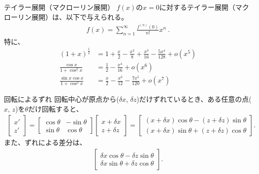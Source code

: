 


\begin{Formula}[label=formula:taylorexpansion]{テイラー展開（マクローリン展開）}
$f(x)$の$x = 0$に対するテイラー展開（マクローリン展開）は、以下で与えられる。
\begin{align*}
  f(x) = \sum_{n=1}^{\infty}\frac{f^{(n)}(0)}{n!}x^n\ .
\end{align*}
特に、
\begin{align*}
  (1+x)^\frac12 &= 1+\frac x2-\frac{x^2}8+\frac{x^3}{16}-\frac{5x^4}{128}+o\!\left(x^5\right)\\
  \frac{\cos x}{1+\cos^2x} &= \frac12-\frac{x^4}{16}+o\left(x^6\right)\\
  \frac{\sin x\cos x}{1+\cos^2x} &= \frac x2-\frac{x^3}{12}-\frac{7x^5}{120}+o\left(x^7\right)
\end{align*}
\end{Formula}



\begin{Formula}{回転によるずれ}
回転中心が原点から($\delta x$, $\delta z$)だけずれているとき、ある任意の点($x$, $z$)を$\theta$だけ回転すると、
\begin{align*}
  \left[
    \begin{array}{c}
      x'\\
      z'
    \end{array}
  \right]
  = \left[
    \begin{array}{cc}
      \cos\theta & -\sin\theta\\
      \sin\theta & \cos\theta
    \end{array}
  \right]\!\!
  \left[
    \begin{array}{c}
      x+\delta x\\
      z+\delta z
    \end{array}
  \right]
  = \left[
    \begin{array}{c}
      (x+\delta x)\cos\theta-(z+\delta z)\sin\theta\\
      (x+\delta x)\sin\theta+(z+\delta z)\cos\theta
    \end{array}
  \right].
\end{align*}
また、ずれによる差分は、
\begin{align*}
  \left[
    \begin{array}{c}
      \delta x\cos\theta-\delta z\sin\theta\\
      \delta x\sin\theta+\delta z\cos\theta
    \end{array}
  \right].
\end{align*}
\end{Formula}



